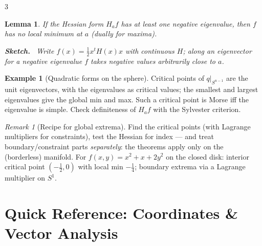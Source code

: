 \documentclass[10pt,a4paper,landscape]{article}
\theoremstyle{definition}
\newtheorem{exm}{Example}[section]
\theoremstyle{plain}
\newtheorem{lem}{Lemma}[section]
\theoremstyle{remark}
\newtheorem{rem}{Remark}[section]
\newcommand{\restr}[2]{#1|_{#2}}
\newenvironment{proofsketch}{%
  \par\small\color{exgray}\textbf{Sketch.}\ }%
  {\par}
\begin{document}
\begin{multicols*}{3}
\begin{lem}
If the Hessian form $H_a f$ has at least one negative eigenvalue, then $f$ has no local minimum at $a$ (dually for maxima).
\begin{proofsketch}
Write $f(x) = \frac12 x^t H(x) x$ with continuous $H$; along an eigenvector for a negative eigenvalue $f$ takes negative values arbitrarily close to $a$.
\end{proofsketch}
\end{lem}

\begin{exm}[Quadratic forms on the sphere]
Critical points of $\restr{q}{S^{n-1}}$ are the unit eigenvectors, with the eigenvalues as critical values; the smallest and largest eigenvalues give the global min and max. Such a critical point is Morse iff the eigenvalue is simple. Check definiteness of $H_a f$ with the Sylvester criterion.
\end{exm}

\begin{rem}[Recipe for global extrema]
Find the critical points (with Lagrange multipliers for constraints), test the Hessian for index --- and treat boundary/constraint parts \emph{separately}: the theorems apply only on the (borderless) manifold. For $f(x,y) = x^2 + x + 2y^2$ on the closed disk: interior critical point $(-\frac12, 0)$ with local min $-\frac14$; boundary extrema via a Lagrange multiplier on $S^1$.
\end{rem}

\section{Quick Reference: Coordinates \& Vector Analysis}


\end{multicols*}
\end{document}
